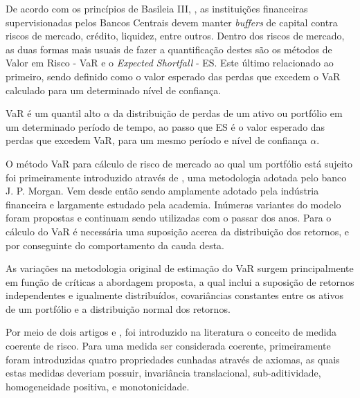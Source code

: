 \documentclass[1p]{elsarticle}
\theoremstyle{definition}
\begin{document}
De acordo com os princípios de Basileia III, \cite{BankingSupervision2011, BankingSupervision2013, BankingSupervision2014},  as instituições financeiras supervisionadas pelos Bancos Centrais devem manter \emph{buffers} de capital contra riscos de mercado, crédito, liquidez, entre outros. Dentro dos riscos de mercado, as duas formas mais usuais de fazer a quantificação destes são os métodos de Valor em Risco - VaR e o \emph{Expected Shortfall} - ES. Este último relacionado ao primeiro, sendo definido como o valor esperado das perdas que excedem o VaR calculado para um determinado nível de confiança.

VaR é um quantil alto $\alpha$ da distribuição de perdas de um ativo ou portfólio em um determinado período de tempo, ao passo que ES é o valor esperado das perdas que excedem VaR, para um mesmo período e nível de confiança $\alpha$.

O método VaR para cálculo de risco de mercado ao qual um portfólio está sujeito foi primeiramente introduzido através de \cite{RiskMetrics1995}, uma metodologia adotada pelo banco J. P. Morgan. Vem desde então sendo amplamente adotado pela indústria financeira e largamente estudado pela academia. Inúmeras variantes do modelo foram propostas e continuam sendo utilizadas com o passar dos anos. Para o cálculo do VaR é necessária uma suposição acerca da distribuição dos retornos, e por conseguinte do comportamento da cauda desta.

As variações na metodologia original de estimação do VaR surgem principalmente em função de críticas a abordagem proposta, a qual inclui a suposição de retornos independentes e igualmente distribuídos, covariâncias constantes entre os ativos de um portfólio e a distribuição normal dos retornos. 

Por meio de dois artigos \cite{Artzner1997} e \cite{Artzner1999}, foi introduzido na literatura o conceito de medida coerente de risco. Para uma medida ser considerada coerente, primeiramente foram introduzidas quatro propriedades cunhadas através de axiomas, as quais estas medidas deveriam possuir, invariância translacional, sub-aditividade, homogeneidade positiva, e monotonicidade.
\end{document}
